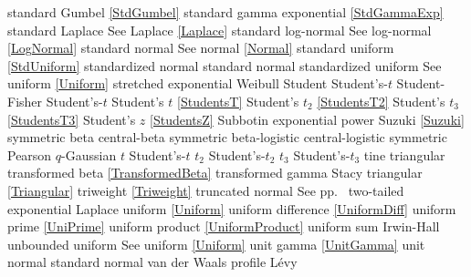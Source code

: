standard Gumbel 				\dotfill	\eqref{StdGumbel} 					\ncite	%
standard gamma exponential		\dotfill	\eqref{StdGammaExp} 				\ncite	%
standard Laplace				\dotfill	See Laplace \eqref{Laplace}			\ncite	%
standard log-normal				\dotfill	See log-normal \eqref{LogNormal} 	\ncite	%
standard normal 				\dotfill	See normal \eqref{Normal} 			\ncite	%
standard uniform				\dotfill	\eqref{StdUniform}					\ncite	%
standardized normal 			\dotfill	standard normal						\ncite	%
standardized uniform 			\dotfill	See uniform \eqref{Uniform}			\ncite	%
stretched exponential 			\dotfill	Weibull 								
Student							\dotfill 	Student's-$t$						\ncite	%
Student-Fisher					\dotfill	Student's-$t$							%
Student's $t$					\dotfill	\eqref{StudentsT}  					\ncite	%
Student's $t_2$					\dotfill	\eqref{StudentsT2}  				\ncite	%
Student's $t_3$					\dotfill	\eqref{StudentsT3}  				\ncite	
Student's $z$					\dotfill	\eqref{StudentsZ}					\ncite	%
Subbotin						\dotfill	exponential power					\ncite
Suzuki							\dotfill	\eqref{Suzuki}						\ncite
symmetric beta					\dotfill	central-beta	 					\ncite	
symmetric beta-logistic			\dotfill	central-logistic				\mcite{\self}
symmetric Pearson				\dotfill	$q$-Gaussian						\mcite{\self}		%
%
$t$								\dotfill	Student's-$t$ 						\ncite	%
$t_2$							\dotfill	Student's-$t_2$ 					\ncite	%
$t_3$							\dotfill	Student's-$t_3$ 					\ncite
tine							\dotfill	triangular							\ncite
transformed beta				\dotfill	\eqref{TransformedBeta} 			\ncite	%
transformed gamma				\dotfill	Stacy 								\ncite %
triangular						\dotfill	\eqref{Triangular}					\ncite
triweight						\dotfill	\eqref{Triweight}					\ncite
truncated normal				\dotfill	See pp.~\pageref{TruncatedNormal}	\ncite
two-tailed exponential			\dotfill	Laplace								\ncite %
%
uniform  						\dotfill	\eqref{Uniform}						\ncite 	%
uniform difference				\dotfill	\eqref{UniformDiff}					\ncite
uniform prime					\dotfill	\eqref{UniPrime}					\ncite	%
uniform product 				\dotfill	\eqref{UniformProduct}				\ncite 	%
uniform sum						\dotfill	Irwin-Hall							\ncite
%
unbounded uniform 				\dotfill	See uniform \eqref{Uniform}			\ncite	%
unit gamma						\dotfill	\eqref{UnitGamma} 					\ncite	%
unit normal						\dotfill	standard normal 					\ncite	%
%
van der Waals profile 			\dotfill	L\'{e}vy 							\ncite	%
